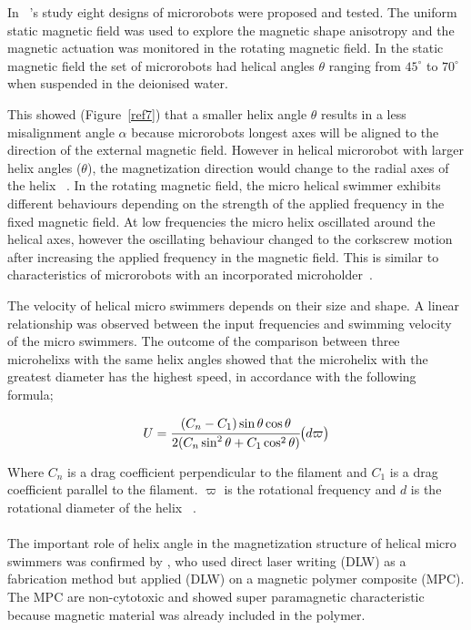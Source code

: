\documentclass[12pt,a4paper,titlepage]{report}
\begin{document}
In ~\citeauthor{tottori2012magnetic}\rq{}s study eight designs of microrobots were proposed and tested. 
The uniform static magnetic field was used to explore the magnetic shape anisotropy and the 
magnetic actuation was monitored in the rotating magnetic field. In the static magnetic field the 
set of microrobots had helical angles $\theta$ ranging from ${45^{\circ}}$ to ${70^{\circ}}$ when suspended in the deionised water. 

This showed (Figure~\ref{ref7}) that a smaller helix angle $\theta$ results in a less misalignment 
angle $\alpha$ because microrobots longest axes will be aligned to the direction of the external magnetic field. 
However in helical microrobot with larger helix angles ($\theta$), the magnetization direction would change to 
the radial axes of the helix  ~\citep{tottori2012magnetic}.
In the rotating magnetic field, the micro helical swimmer exhibits different behaviours depending on 
the strength of the applied frequency in the fixed magnetic field. At low frequencies the micro helix oscillated 
around the helical axes, however the oscillating behaviour changed to the 
corkscrew motion after increasing the applied frequency in the magnetic field. This is similar to characteristics of 
microrobots with an incorporated
 microholder~\citep{tottori2012magnetic}.

The velocity of helical micro swimmers depends on their size and shape. A linear relationship was 
observed between the input frequencies and swimming velocity of the micro swimmers. The outcome of 
the comparison between three microhelixs with the same helix angles showed that the microhelix with the
 greatest diameter has the highest speed, in accordance with the following formula;

\begin{equation}
  U = {\cfrac{(C_n - C_1) \sin \theta \cos \theta}{2(C_n \sin^2 \theta + C_1 \cos^2 \theta)}} \big( d \varpi \big)
\end{equation} 

Where $C_n$ is a drag coefficient perpendicular to the filament and $C_1$ is a drag coefficient
 parallel to the filament. $ \varpi$ is the rotational frequency and $d$ is the rotational diameter of 
the helix ~\citep{tottori2012magnetic}.  



\paragraph{}
The important role of helix angle in the magnetization structure of helical micro swimmers 
was confirmed by \citeauthor{peyer2013bacteria} \citep{peyer2013bacteria}, who used direct laser writing (DLW) as a fabrication method but 
applied (DLW) on a magnetic polymer composite (MPC). The MPC are non-cytotoxic and showed 
super paramagnetic characteristic because magnetic material was already included in the polymer. 
\end{document}
